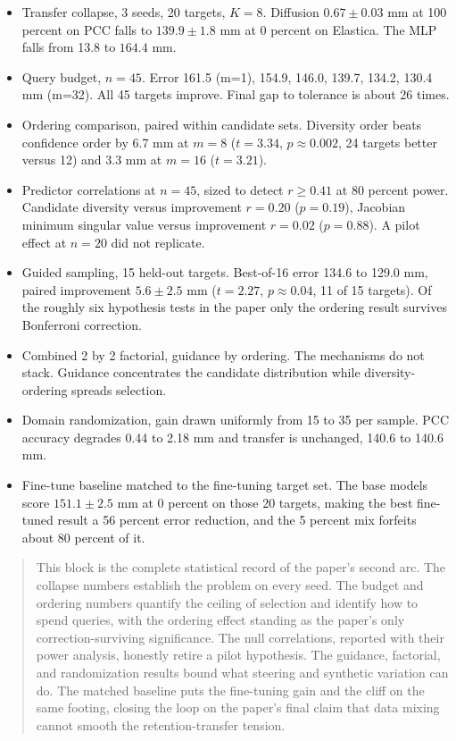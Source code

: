 \documentclass[11pt]{article}
\newcommand{\desc}[1]{\begin{quote}\small #1\end{quote}}
\begin{document}
\begin{itemize}
\item Transfer collapse, 3 seeds, 20 targets, $K{=}8$. Diffusion
$0.67\pm0.03$ mm at 100 percent on PCC falls to $139.9\pm1.8$ mm at 0
percent on Elastica. The MLP falls from 13.8 to $164.4$ mm.
\item Query budget, $n{=}45$. Error 161.5 (m=1), 154.9, 146.0, 139.7,
134.2, 130.4 mm (m=32). All 45 targets improve. Final gap to tolerance is
about 26 times.
\item Ordering comparison, paired within candidate sets. Diversity order
beats confidence order by 6.7 mm at $m{=}8$ ($t{=}3.34$,
$p{\approx}0.002$, 24 targets better versus 12) and 3.3 mm at $m{=}16$
($t{=}3.21$).
\item Predictor correlations at $n{=}45$, sized to detect $r{\geq}0.41$ at
80 percent power. Candidate diversity versus improvement $r{=}0.20$
($p{=}0.19$), Jacobian minimum singular value versus improvement $r{=}0.02$
($p{=}0.88$). A pilot effect at $n{=}20$ did not replicate.
\item Guided sampling, 15 held-out targets. Best-of-16 error 134.6 to 129.0
mm, paired improvement $5.6\pm2.5$ mm ($t{=}2.27$, $p{\approx}0.04$, 11 of
15 targets). Of the roughly six hypothesis tests in the paper only the
ordering result survives Bonferroni correction.
\item Combined 2 by 2 factorial, guidance by ordering. The mechanisms do not
stack. Guidance concentrates the candidate distribution while
diversity-ordering spreads selection.
\item Domain randomization, gain drawn uniformly from 15 to 35 per sample.
PCC accuracy degrades 0.44 to 2.18 mm and transfer is unchanged, 140.6 to
140.6 mm.
\item Fine-tune baseline matched to the fine-tuning target set. The base
models score $151.1\pm2.5$ mm at 0 percent on those 20 targets, making the
best fine-tuned result a 56 percent error reduction, and the 5 percent mix
forfeits about 80 percent of it.
\end{itemize}

\desc{This block is the complete statistical record of the paper's second
arc. The collapse numbers establish the problem on every seed. The budget
and ordering numbers quantify the ceiling of selection and identify how to
spend queries, with the ordering effect standing as the paper's only
correction-surviving significance. The null correlations, reported with
their power analysis, honestly retire a pilot hypothesis. The guidance,
factorial, and randomization results bound what steering and synthetic
variation can do. The matched baseline puts the fine-tuning gain and the
cliff on the same footing, closing the loop on the paper's final claim that
data mixing cannot smooth the retention-transfer tension.}
\end{document}
